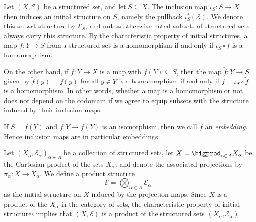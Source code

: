 \documentclass[article, a4paper, 11pt, oneside]{memoir}
\numberwithin{equation}{chapter}
\newcommand{\calE}{\mathcal{E}}
\begin{document}
\begin{examplebreak}[Subsets]
    \label{ex:subset_structure}
    Let $(X,\calE)$ be a structured set, and let $S \subseteq X$. The inclusion map $\iota_S \colon S \to X$ then induces an initial structure on $S$, namely the pullback $\iota_S^*(\calE)$. We denote this subset structure by $\calE_S$, and unless otherwise noted subsets of structured sets always carry this structure. By the characteristic property of initial structures, a map $f \colon Y \to S$ from a structured set is a homomorphism if and only if $\iota_S \circ f$ is a homomorphism.

    On the other hand, if $f \colon Y \to X$ is a map with $f(Y) \subseteq S$, then the map $\tilde f \colon Y \to S$ given by $\tilde f(y) = f(y)$ for all $y \in Y$ is a homomorphism if and only if $f = \iota_S \circ \tilde f$ is a homomorphism. In other words, whether a map is a homomorphism or not does not depend on the codomain if we agree to equip subsets with the structure induced by their inclusion maps.

    If $S = f(Y)$ and $\tilde f \colon Y \to f(Y)$ is an isomorphism, then we call $f$ an \emph{embedding}. Hence inclusion maps are in particular embeddings.
\end{examplebreak}

\begin{examplebreak}[Products]
    \label{ex:product_structure}
    Let $(X_\alpha, \calE_\alpha)_{\alpha \in A}$ be a collection of structured sets, let $X = \bigprod_{\alpha \in A} X_\alpha$ be the Cartesian product of the sets $X_\alpha$, and denote the associated projections by $\pi_\alpha \colon X \to X_\alpha$. We define a product structure
    \begin{equation*}
        \calE = \bigotimes_{\alpha \in A} \calE_\alpha
    \end{equation*}
    as the initial structure on $X$ induced by the projection maps. Since $X$ is a product of the $X_\alpha$ in the category of sets, the characteristic property of initial structures implies that $(X,\calE)$ is a product of the structured sets $(X_\alpha,\calE_\alpha)$.
\end{examplebreak}
\end{document}
